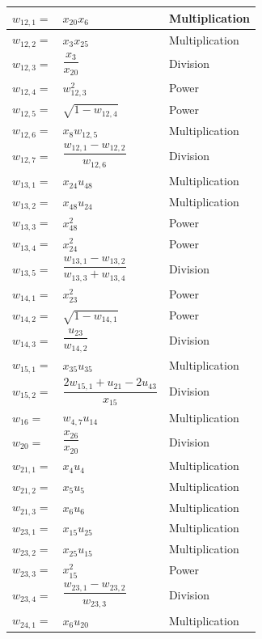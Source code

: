 \begin{longtable}{|p{1.5cm}|l|p{2cm}|}
$w_{12,1}=$ & $ x_{20}x_{6} $ & Multiplication \\ \hline
$w_{12,2}=$ & $ x_{3}x_{25}$ & Multiplication \\ \hline
$w_{12,3}=$ & $ \dfrac{x_{3}}{x_{20}} $ & Division \\ \hline
$w_{12,4}=$ & $ w_{12,3}^{2} $ & Power \\ \hline
$w_{12,5}=$ & $ \sqrt{1-w_{12,4}} $ & Power \\ \hline
$w_{12,6}=$ & $ x_{8}w_{12,5} $ & Multiplication \\ \hline
$w_{12,7}=$ & $ \dfrac{w_{12,1}-w_{12,2}}{w_{12,6}} $ & Division \\ \hline
$w_{13,1}=$ & $ x_{24}u_{48} $ & Multiplication \\ \hline
$w_{13,2}=$ & $ x_{48}u_{24} $ & Multiplication \\ \hline
$w_{13,3}=$ & $ x_{48}^{2} $ & Power \\ \hline
$w_{13,4}=$ & $ x_{24}^{2} $ & Power \\ \hline
$w_{13,5}=$ & $ \dfrac{w_{13,1}-w_{13,2}}{w_{13,3}+w_{13,4}} $ & Division\\ \hline
$w_{14,1}=$ & $ x_{23}^{2} $ & Power \\ \hline
$w_{14,2}=$ & $ \sqrt{1-w_{14,1}} $ & Power \\ \hline
$w_{14,3}=$ & $ \dfrac{u_{23}}{w_{14,2}} $ & Division \\ \hline
$w_{15,1}=$ & $ x_{35}u_{35} $ & Multiplication \\ \hline 
$w_{15,2}=$ & $ \dfrac{2w_{15,1}+u_{21}-2u_{43}}{x_{15}} $ & Division \\ \hline 
$w_{16}=$ & $ w_{4,7}u_{14} $ & Multiplication \\ \hline
$w_{20}=$ & $ \dfrac{x_{26}}{x_{20}} $ & Division \\ \hline
$w_{21,1}=$ & $ x_{4}u_{4} $ & Multiplication \\ \hline
$w_{21,2}=$ & $ x_{5}u_{5} $ & Multiplication \\ \hline
$w_{21,3}=$ & $ x_{6}u_{6} $ & Multiplication \\ \hline
$w_{23,1}=$ & $ x_{15}u_{25} $ & Multiplication \\ \hline
$w_{23,2}=$ & $ x_{25}u_{15} $ & Multiplication \\ \hline
$w_{23,3}=$ & $ x_{15}^{2} $ & Power  \\ \hline
$w_{23,4}=$ & $ \dfrac{w_{23,1}-w_{23,2}}{w_{23,3}} $ & Division \\ \hline
$w_{24,1}=$ & $ x_{6}u_{20} $ & Multiplication \\ \hline

\end{longtable}
